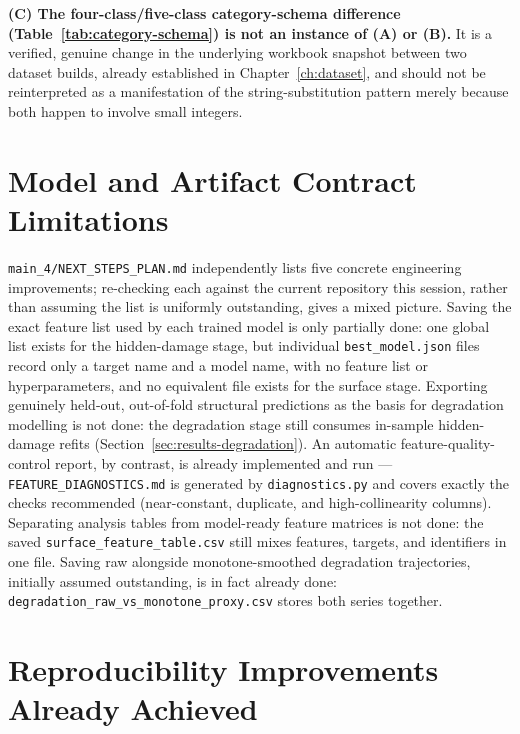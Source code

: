 \textbf{(C) The four-class/five-class category-schema difference
(Table~\ref{tab:category-schema}) is not an instance of (A) or (B).} It is
a verified, genuine change in the underlying workbook snapshot between two
dataset builds, already established in Chapter~\ref{ch:dataset}, and
should not be reinterpreted as a manifestation of the string-substitution
pattern merely because both happen to involve small integers.

\section{Model and Artifact Contract Limitations}
\label{sec:eng-contracts}

\texttt{main\_4/NEXT\_STEPS\_PLAN.md} independently lists five concrete
engineering improvements; re-checking each against the current repository
this session, rather than assuming the list is uniformly outstanding,
gives a mixed picture. Saving the exact feature list used by each trained
model is only partially done: one global list exists for the hidden-damage
stage, but individual \texttt{best\_model.json} files record only a target
name and a model name, with no feature list or hyperparameters, and no
equivalent file exists for the surface stage. Exporting genuinely
held-out, out-of-fold structural predictions as the basis for degradation
modelling is not done: the degradation stage still consumes in-sample
hidden-damage refits (Section~\ref{sec:results-degradation}). An automatic
feature-quality-control report, by contrast, is already implemented and
run — \texttt{FEATURE\_DIAGNOSTICS.md} is generated by
\texttt{diagnostics.py} and covers exactly the checks recommended
(near-constant, duplicate, and high-collinearity columns). Separating
analysis tables from model-ready feature matrices is not done: the saved
\texttt{surface\_feature\_table.csv} still mixes features, targets, and
identifiers in one file. Saving raw alongside monotone-smoothed
degradation trajectories, initially assumed outstanding, is in fact
already done: \texttt{degradation\_raw\_vs\_monotone\_proxy.csv} stores
both series together.

\section{Reproducibility Improvements Already Achieved}
\label{sec:eng-achieved}

